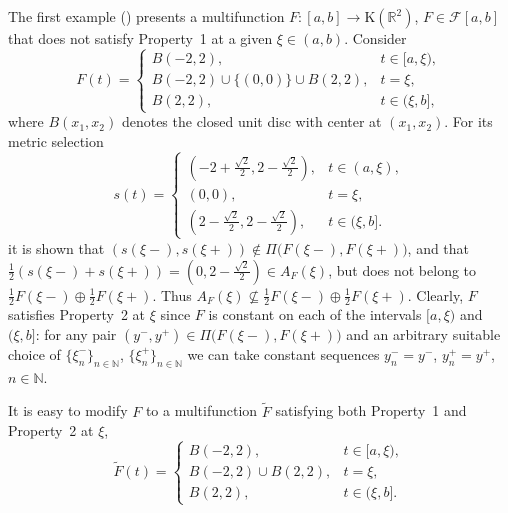 \documentclass[final,3p,mathptmx]{article}%
\newcommand{\R}{{\mathbb R}}
\newcommand{\N}{{\mathbb N}}
\newcommand{\Pair}[2]{\Pi \big ( {#1},{#2} \big )}
\begin{document}
{{{{The first example (\cite[Example~7.3]{BDFM:2021})} presents a multifunction $F: [a,b] \to {\mathrm{K}(\R^2)}$, $F \in \mathcal{F}[a,b]$ that does not satisfy Property~1 at a given $\xi \in (a,b)$. Consider
$$
F(t) = \begin{cases}
	B(-2,2), & t \in [a,\xi), \\
	B(-2,2) \cup \{(0,0)\}  \cup B(2,2), & t = \xi, \\
	B(2,2), & t \in (\xi,b],
\end{cases}
$$
where $B(x_1,x_2)$ denotes the closed unit disc with center at $(x_1,x_2)$.
For its metric selection
$$
s(t) = \begin{cases}
	(-2 + \frac{\sqrt{2}}{2}, 2 - \frac{\sqrt{2}}{2}), & t \in (a,\xi),  \\
	(0,0), & t = \xi,\\
	(2 - \frac{\sqrt{2}}{2}, 2 - \frac{\sqrt{2}}{2}), & t \in (\xi,b].
\end{cases}
$$
it is shown that $(s(\xi-), s(\xi+)) \not\in  \Pair{F(\xi-)}{F(\xi+)}$, and that ${\frac{1}{2} ( s(\xi-) + s(\xi+)) = (0, 2 - \frac{\sqrt{2}}{2}) \in A_F(\xi)}$, but does not belong to ${\frac{1}{2} F(\xi-) \oplus \frac{1}{2} F(\xi+)}$. Thus $A_F(\xi) \not\subseteq \frac{1}{2} F(\xi-)\oplus \frac{1}{2} F(\xi+)$. Clearly, $F$ satisfies Property~2 at $\xi$ since $F$ is constant on each of the intervals $[a,\xi)$ and $(\xi,b]$: for any pair $(y^-, y^+) \in \Pair{F(\xi-)}{F(\xi+)}$ and an arbitrary suitable choice of $\{\xi_n^-\}_{n \in \N}$, $\{\xi_n^+\}_{n \in \N}$  we can take constant sequences $y_n^- = y^-$, $y_n^+ = y^+$, $n \in \N$.

It is easy to modify $F$ to a multifunction $\widetilde F$ satisfying both Property~1 and Property~2 at $\xi$, 
$$
\widetilde F(t) = \begin{cases}
	B(-2,2), & t \in [a,\xi), \\
	B(-2,2) \cup B(2,2), & t = \xi, \\
	B(2,2), & t \in (\xi,b].
\end{cases}
$$
\medskip

}}}
\end{document}

